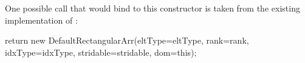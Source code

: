 One possible call that would bind to this constructor is taken from the existing
implementation of :
\begin{chapel}
      return new DefaultRectangularArr(eltType=eltType, rank=rank, idxType=idxType,
                                      stridable=stridable, dom=this);
\end{chapel}


%
%
%

